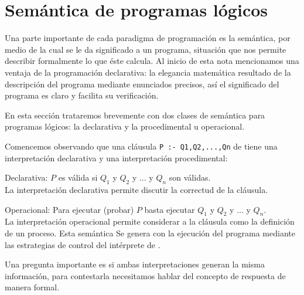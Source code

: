 \documentclass[11pt,letterpaper]{article}
\begin{document}
\section{Sem\'antica de programas l\'ogicos}

Una parte importante de cada paradigma de programaci\'on es la
sem\'antica, por medio de la cual se le da significado a un programa,
situaci\'on que nos permite describir formalmente lo que \'este calcula.
Al inicio de esta nota mencionamos una ventaja de la programación declarativa: 
la elegancia matem\'atica resultado de la descripci\'on del programa mediante 
enunciados precisos, as\'i el significado del programa es claro y facilita su 
verificaci\'on.

\medskip

En esta secci\'on trataremos brevemente con dos clases de sem\'antica para 
programas l\'ogicos: la declarativa y la procedimental u operacional.


Comencemos observando que una cl\'ausula \verb=P :- Q1,Q2,...,Qn= de 
{\pl} tiene una interpretaci\'on declarativa y una interpretaci\'on 
procedimental:
\bi
 \item Declarativa: $P$ es v\'alida si $Q_1$ y $Q_2$ y $\ldots$ y
  $Q_n$ son v\'alidas.\\
  La interpretaci\'on declarativa permite discutir la correctud de
    la cl\'ausula.
 \item Operacional: Para ejecutar (probar) $P$ basta ejecutar $Q_1$ y $Q_2$ y 
  $\ldots$ y $Q_n$. \\
  La interpretaci\'on operacional permite considerar a la cl\'ausula como 
  la definici\'on de un proceso. Esta sem\'antica Se genera con la     
  ejecuci\'on del programa mediante las estrategias de control del int\'erprete 
  de {\pl}.
\ei

Una pregunta importante es si ambas interpretaciones generan la misma
informaci\'on, para contestarla necesitamos hablar del concepto de
respuesta de manera formal.


\end{document}
